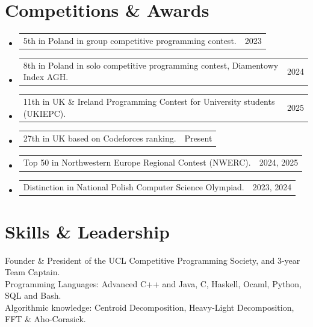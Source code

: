 \documentclass[letterpaper,11pt]{article}
\makeatletter
\newcommand{\resumeCompactListStart}{\begin{itemize}[leftmargin=0.3in, label={\tiny$\bullet$}, nosep, itemsep=2pt]}
\newcommand{\resumeCompactListEnd}{\end{itemize}\vspace{-5pt}}
\newcommand{\resumeAwardItem}[2]{
  \item
  \begin{tabular*}{\linewidth}[t]{l@{\extracolsep{\fill}}r}
    \small#1 \hspace{1em} & #2 \\
  \end{tabular*}\vspace{-3pt}
}
\makeatother
\begin{document}
\section{Competitions \& Awards}
  \resumeCompactListStart
    \resumeAwardItem{5th in Poland in group competitive programming contest.}{2023}
    \resumeAwardItem{8th in Poland in solo competitive programming contest, Diamentowy Index AGH.}{2024}
    \resumeAwardItem{11th in UK \& Ireland Programming Contest for University students (UKIEPC).}{2025}
    \resumeAwardItem{27th in UK based on Codeforces ranking.} {Present}
    \resumeAwardItem{Top 50 in Northwestern Europe Regional Contest (NWERC).}{2024, 2025} 
    \resumeAwardItem{Distinction in National Polish Computer Science Olympiad.}{2023, 2024} 
  \resumeCompactListEnd
\vspace{2mm}
\section{Skills \& Leadership}
 \begin{itemize}[leftmargin=0.15in, label={}]
    \small{\item{
    \vspace{1mm}
     Founder \& President {of the UCL Competitive Programming Society, and 3-year Team Captain. } \\
     \vspace{1mm}
     Programming Languages{: Advanced C++ and Java, C, Haskell, Ocaml, Python, SQL and Bash.} \\
     \vspace{1mm}
     Algorithmic knowledge{: Centroid Decomposition, Heavy-Light Decomposition, FFT \& Aho-Corasick.}       
    }}
 \end{itemize}
\end{document}

